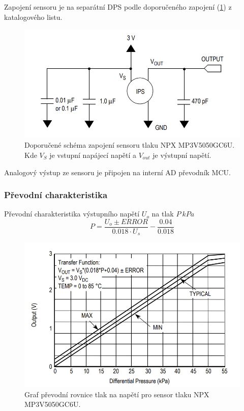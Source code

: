 Zapojení sensoru je na separátní DPS podle doporučeného zapojení (\ref{fig:nxp_recommended}) z katalogového listu.
\begin{figure}[H]
    \centering
    \includegraphics[width=0.9\linewidth]{pictures/nxp_recommended.jpg}
    \caption{Doporučené schéma zapojení sensoru tlaku NPX MP3V5050GC6U. Kde $V_S$ je vstupní napájecí napětí a $V_{out}$ je výstupní napětí.  \cite{cite:NXP}}
    \label{fig:nxp_recommended}
\end{figure}
Analogový výstup ze sensoru je připojen na interní AD převodník MCU.
\subsubsection{Převodní charakteristika}
Převodní charakteristika výstupního napětí $U_{o}$ na tlak $P \ kPa$
\begin{equation}
    P = \frac{U_o \pm ERROR}{0.018 \cdot U_s} - \frac{0.04}{0.018}
    \label{eq:nxp_transfer}
\end{equation}

\begin{figure}[H]
    \centering
    \includegraphics[width=0.9\linewidth]{pictures/nxp_transfer.jpg}
    \caption{Graf převodní rovnice tlak na napětí pro sensor tlaku NPX MP3V5050GC6U. \cite{cite:NXP}}
    \label{fig:nxp_transfer}
\end{figure}

